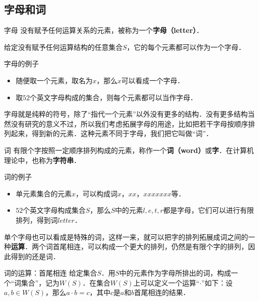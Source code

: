 
\subsection{字母和词}

\begin{definition}{字母}
没有赋予任何运算关系的元素，被称为一个\textbf{字母（letter）}．
\end{definition}

给定没有赋予任何运算结构的任意集合$S$，它的每个元素都可以作为一个字母．

\begin{example}{字母的例子}
\begin{itemize}
\item 随便取一个元素，取名为$x$，那么$x$可以看成一个字母．
\item 取$52$个英文字母构成的集合，则每个元素都可以当作字母．
\end{itemize}
\end{example}

字母就是纯粹的符号，除了“指代一个元素”以外没有更多的结构．没有更多结构当然没有研究的意义不过，所以我们考虑拓展字母的用途，比如把若干字母按顺序排列起来，得到新的元素．这种元素不同于字母，我们把它叫做“词”．

\begin{definition}{词}
有限个字按照一定顺序排列构成的元素，称作一个\textbf{词（word）}或\textbf{字}．在计算机理论中，也称为\textbf{字符串}．
\end{definition}

\begin{example}{词的例子}
\begin{itemize}
\item 单元素集合的元素$x$，可以构成词$x$，$xx$，$xxxxxxx$等．
\item $52$个英文字母构成集合$S$，那么$S$中的元素$l, e, t, r$都是字母，它们可以进行有限排列，得到词$letter$．
\end{itemize}

\end{example}

单个字母也可以看成是特殊的词，这样一来，就可以把字的排列拓展成词之间的一种\textbf{运算}．两个词首尾相连，可以构成一个更大的排列，仍然是有限个字的排列，因此得到的还是词．

\begin{definition}{词的运算：首尾相连}
给定集合$S$．用$S$中的元素作为字母所排出的词，构成一个“词集合”，记为$W(S)$．在集合$W(S)$上可以定义一个运算“$\cdot$”如下：设$a, b\in W(S)$，那么$a\cdot b=c$，其中$c$是$a$和$b$首尾相连的结果．
\end{definition}

